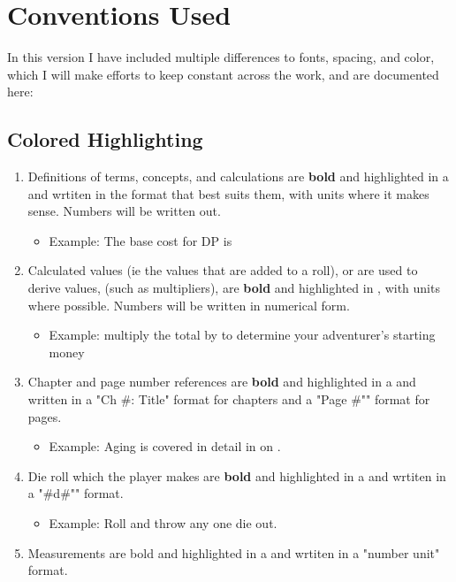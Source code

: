 \section{Conventions Used}
In this version I have included multiple differences to fonts, spacing, and color, which I will make efforts to keep constant across the work, and are documented here:
\subsection{Colored Highlighting}
\begin{enumerate}[leftmargin=12pt]
\item Definitions of terms, concepts, and calculations are \textbf{bold} and highlighted in a  and wrtiten in the format that best suits them, with units where it makes sense. Numbers will be written out.
	\begin{itemize}\item Example: The base cost for DP is \end{itemize}
\item Calculated values (ie the values that are added to a roll), or are used to derive values, (such as multipliers), are \textbf{bold} and highlighted in , with units where possible. Numbers will be written in numerical form.
	\begin{itemize}\item Example: multiply the total by  to determine your adventurer's starting money\end{itemize}
\item Chapter and page number references are \textbf{bold} and highlighted in a  and written in a "Ch \#: Title" format for chapters and a "Page \#"" format for pages.
	\begin{itemize}\item Example: Aging is covered in detail in  on .\end{itemize}
\item Die roll which the player makes are \textbf{bold} and highlighted in a  and wrtiten in a "\#d\#"" format.
	\begin{itemize}\item Example: Roll  and throw any one die out.\end{itemize}
\item Measurements are bold and highlighted in  a and wrtiten in a "number unit" format.

\end{enumerate}
